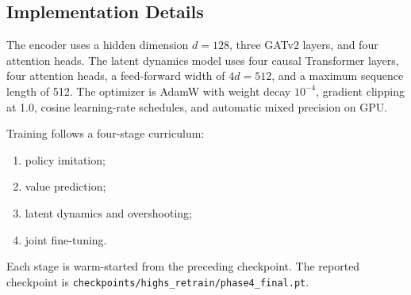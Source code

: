 \documentclass{article}
\begin{document}






\subsection{Implementation Details}
\label{app:implementation}

The encoder uses a hidden dimension $d=128$, three GATv2 layers, and four attention heads. The latent dynamics model uses four causal Transformer layers, four attention heads, a feed-forward width of $4d=512$, and a maximum sequence length of 512. The optimizer is AdamW with weight decay $10^{-4}$, gradient clipping at 1.0, cosine learning-rate schedules, and automatic mixed precision on GPU.

Training follows a four-stage curriculum:
\begin{enumerate}
    \item policy imitation;
    \item value prediction;
    \item latent dynamics and overshooting;
    \item joint fine-tuning.
\end{enumerate}
Each stage is warm-started from the preceding checkpoint. The reported checkpoint is \texttt{checkpoints/highs\_retrain/phase4\_final.pt}.
\end{document}
